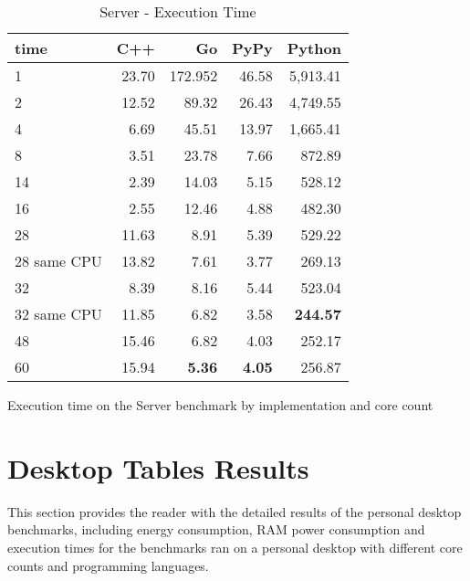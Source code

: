\begin{table}[H]
    \centering
    \begin{tabular}{lrrrr}
        \hline
        time         & C++             & Go            & PyPy          & Python     \\
        \hline
        1            & 23.70           & 172.952       & 46.58         & 5,913.41        \\
        2            & 12.52           & 89.32         & 26.43         & 4,749.55        \\
        4            & 6.69            & 45.51         & 13.97         & 1,665.41        \\
        8	         & 3.51  	       & 23.78 	       & 7.66          & 872.89          \\
        14           & 2.39            & 14.03         & 5.15          & 528.12          \\
        16           & 2.55            & 12.46         & 4.88          & 482.30          \\
        28           & 11.63           & 8.91          & 5.39          & 529.22          \\
        28 same CPU  & 13.82           & 7.61          & 3.77          & 269.13          \\
        32           & 8.39            & 8.16          & 5.44          & 523.04          \\
        32 same CPU  & 11.85           & 6.82          & 3.58          & \textbf{244.57} \\
        48           & 15.46           & 6.82          & 4.03          & 252.17          \\
        60           & 15.94           & \textbf{5.36} & \textbf{4.05} & 256.87          \\
        \hline
    \end{tabular}
\caption{Server - Execution Time}{Execution time on the Server benchmark by implementation and core count}
\label{tab:server-execution-time}
\end{table}

\chapter{Desktop Tables Results}
\label{chap:appendix-desktop-benchmarks}

This section provides the reader with the detailed results of the personal desktop benchmarks, including energy consumption, RAM power consumption and execution times for the benchmarks ran on a personal desktop with different core counts and programming languages.

